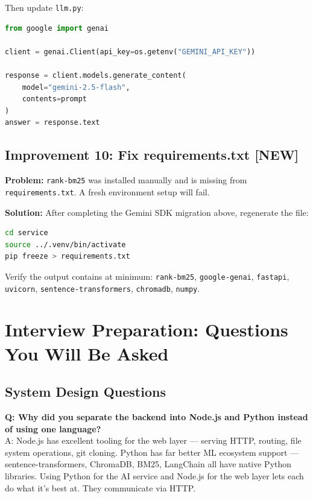 \documentclass[a4paper,11pt]{article}
\begin{document}
Then update \texttt{llm.py}:
\begin{lstlisting}[language=Python]
from google import genai

client = genai.Client(api_key=os.getenv("GEMINI_API_KEY"))

response = client.models.generate_content(
    model="gemini-2.5-flash",
    contents=prompt
)
answer = response.text
\end{lstlisting}

\subsection{Improvement 10: Fix requirements.txt \textbf{[NEW]}}

\textbf{Problem:} \texttt{rank-bm25} was installed manually and is missing from \texttt{requirements.txt}. A fresh environment setup will fail.

\textbf{Solution:} After completing the Gemini SDK migration above, regenerate the file:
\begin{lstlisting}[language=bash]
cd service
source ../.venv/bin/activate
pip freeze > requirements.txt
\end{lstlisting}

Verify the output contains at minimum: \texttt{rank-bm25}, \texttt{google-genai}, \texttt{fastapi}, \texttt{uvicorn}, \texttt{sentence-transformers}, \texttt{chromadb}, \texttt{numpy}.

\newpage

\section{Interview Preparation: Questions You Will Be Asked}

\subsection{System Design Questions}

\textbf{Q: Why did you separate the backend into Node.js and Python instead of using one language?}\\[3pt]
A: Node.js has excellent tooling for the web layer --- serving HTTP, routing, file system operations, git cloning. Python has far better ML ecosystem support --- sentence-transformers, ChromaDB, BM25, LangChain all have native Python libraries. Using Python for the AI service and Node.js for the web layer lets each do what it's best at. They communicate via HTTP.
\end{document}
